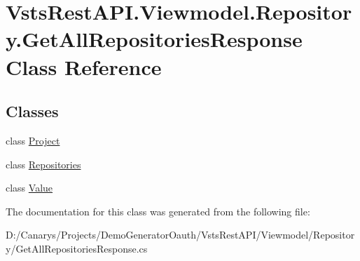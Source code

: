 \hypertarget{class_vsts_rest_a_p_i_1_1_viewmodel_1_1_repository_1_1_get_all_repositories_response}{}\section{Vsts\+Rest\+A\+P\+I.\+Viewmodel.\+Repository.\+Get\+All\+Repositories\+Response Class Reference}
\label{class_vsts_rest_a_p_i_1_1_viewmodel_1_1_repository_1_1_get_all_repositories_response}
\subsection*{Classes}
\begin{DoxyCompactItemize}
\item 
class \mbox{\hyperlink{class_vsts_rest_a_p_i_1_1_viewmodel_1_1_repository_1_1_get_all_repositories_response_1_1_project}{Project}}
\item 
class \mbox{\hyperlink{class_vsts_rest_a_p_i_1_1_viewmodel_1_1_repository_1_1_get_all_repositories_response_1_1_repositories}{Repositories}}
\item 
class \mbox{\hyperlink{class_vsts_rest_a_p_i_1_1_viewmodel_1_1_repository_1_1_get_all_repositories_response_1_1_value}{Value}}
\end{DoxyCompactItemize}


The documentation for this class was generated from the following file\+:\begin{DoxyCompactItemize}
\item 
D\+:/\+Canarys/\+Projects/\+Demo\+Generator\+Oauth/\+Vsts\+Rest\+A\+P\+I/\+Viewmodel/\+Repository/Get\+All\+Repositories\+Response.\+cs\end{DoxyCompactItemize}
